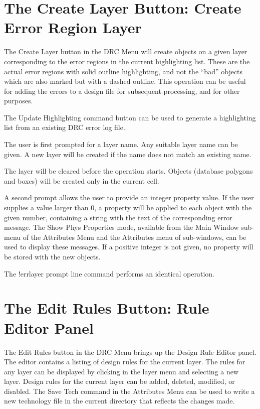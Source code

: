 \section{The {\cb Create Layer} Button: Create Error Region Layer}
The {\cb Create Layer} button in the {\cb DRC Menu} will create
objects on a given layer corresponding to the error regions in the
current highlighting list.  These are the actual error regions with
solid outline highlighting, and not the ``bad'' objects which are also
marked but with a dashed outline.  This operation can be useful for
adding the errors to a design file for subsequent processing, and for
other purposes.

The {\cb Update Highlighting} command button can be used to generate a
highlighting list from an existing DRC error log file.

The user is first prompted for a layer name.  Any suitable layer name
can be given.  A new layer will be created if the name does not match
an existing name.

The layer will be cleared before the operation starts.  Objects
(database polygons and boxes) will be created only in the current
cell.

A second prompt allows the user to provide an integer property value. 
If the user supplies a value larger than 0, a property will be applied
to each object with the given number, containing a string with the
text of the corresponding error message.  The {\cb Show Phys
Properties} mode, available from the {\cb Main Window} sub-menu of the
{\cb Attributes Menu} and the {\cb Attributes} menu of sub-windows,
can be used to display these messages.  If a positive integer is not
given, no property will be stored with the new objects.

The {\cb !errlayer} prompt line command performs an identical
operation.


\section{The {\cb Edit Rules} Button: Rule Editor Panel}
The {\cb Edit Rules} button in the {\cb DRC Menu} brings up the {\cb
Design Rule Editor} panel.  The editor contains a listing of design
rules for the current layer.  The rules for any layer can be displayed
by clicking in the layer menu and selecting a new layer.  Design rules
for the current layer can be added, deleted, modified, or disabled. 
The {\cb Save Tech} command in the {\cb Attributes Menu} can be used
to write a new technology file in the current directory that reflects
the changes made.

